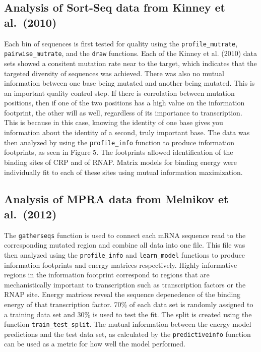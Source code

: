 \documentclass{bmcart}
\begin{document}
\subsection*{Analysis of Sort-Seq data from Kinney et al.\ (2010)}
    Each bin of sequences is first tested for quality using the \texttt{profile\_mutrate},
\texttt{pairwise\_mutrate}, and the \texttt{draw} functions. Each of the Kinney et al. (2010) 
data sets showed a consitent mutation rate near to the target, which indicates that the targeted
diversity of sequences was achieved. There was also no mutual information between one base being
mutated and another being mutated. This is an important quality control step. If there is
corrolation between mutation positions, then if one of the two positions has a high value on the
information footprint, the other will as well, regardless of its importance to transcription. This
is because in this case, knowing the identity of one base gives you information about the identity
of a second, truly important base. The data was then analyzed by using the \texttt{profile\_info} 
function to produce information footprints, as seen in Figure 5. The footprints allowed
identification of the binding sites of CRP and of RNAP. Matrix models for binding energy were individually
fit to each of these sites using mutual information maximization.

\subsection*{Analysis of MPRA data from Melnikov et al.\ (2012)}
    The \texttt{gatherseqs} function is used to connect each mRNA sequence read to the corresponding
mutated region and combine all data into one file. This file was then analyzed using the \texttt{profile\_info}
 and \texttt{learn\_model} functions to produce information footprints and energy matrices respectively.
 Highly informative regions in the information footprint correspond to regions that are mechanistically important
to transcription such as transcription factors or the RNAP site. Energy matrices reveal the sequence depenedence
of the binding energy of that transcription factor. 70\% of each data set is randomly assigned to a training data set
and 30\% is used to test the fit. The split is created using the function \texttt{train\_test\_split}. The mutual 
information between the energy model predictions and the test data set, as calculated by the \texttt{predictiveinfo} function
 can be used as a metric for how well the model performed. 
\end{document}
